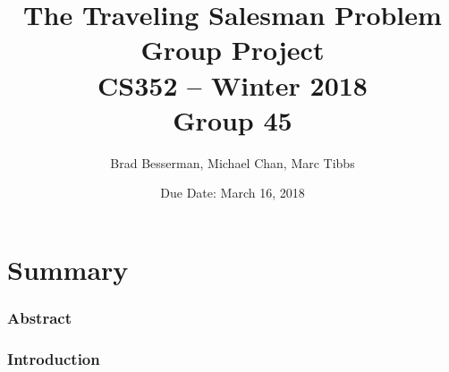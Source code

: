 \documentclass{article}
\title{The Traveling Salesman Problem Group Project\\[.25cm] CS352 – Winter 2018\\[.5cm]Group 45}
\author{Brad Besserman, Michael Chan, Marc Tibbs}
\date{Due Date: March 16, 2018}
\begin{document}
\maketitle

\part*{Summary}

\section{Abstract}

\section{Introduction}

\newpage





\newpage
\printbibliography
\end{document}
